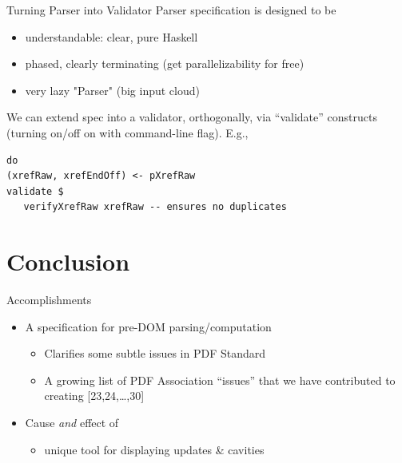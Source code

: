 \documentclass[t,10pt,xcolor={dvipsnames}]{beamer}
\begin{document}
\begin{frame}[label={sec:org6399689},fragile]{Turning Parser into Validator}
 Parser specification is designed to be
\begin{itemize}
\item understandable: clear, pure Haskell
\item phased, clearly terminating (get parallelizability for free)
\item very lazy "Parser" (big input cloud)
\end{itemize}

We can extend spec into a validator, orthogonally, via “validate” constructs
(turning on/off on with command-line flag).  E.g.,
\lstset{language=haskell,label= ,caption= ,captionpos=b,numbers=none}
\begin{lstlisting}
do
(xrefRaw, xrefEndOff) <- pXrefRaw
validate $
   verifyXrefRaw xrefRaw -- ensures no duplicates
\end{lstlisting}
\end{frame}

\section{Conclusion}
\label{sec:org7f4e75d}
\begin{frame}[label={sec:orgc3ae318}]{Accomplishments}
\begin{itemize}
\item A specification for pre-DOM parsing/computation
\begin{itemize}
\item Clarifies some subtle issues in PDF Standard
\item A growing list of PDF Association “issues” that we have contributed to
creating [23,24,\ldots{},30]
\end{itemize}
\item Cause \emph{and} effect of
\begin{itemize}
\item unique tool for displaying updates \& cavities
\end{itemize}
\end{itemize}
\end{frame}
\end{document}
